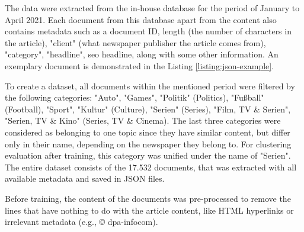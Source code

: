 \documentclass[fontsize=12pt,a4paper,twoside,openany]{scrbook}
\begin{document}
The data were extracted from the in-house database for the period of January to April 2021. Each document from this database apart from the content also contains metadata such as a document ID, length (the number of characters in the article), "client" (what newspaper publisher the article comes from), "category", "headline", seo headline, along with some other information. An exemplary document is demonstrated in the Listing \ref{listing:json-example}.

To create a dataset, all documents within the mentioned period were filtered by the following categories: "Auto", "Games", "Politik" (Politics), "Fußball" (Football), "Sport", "Kultur" (Culture), "Serien" (Series), "Film, TV \& Serien", "Serien, TV \& Kino" (Series, TV \& Cinema). The last three categories were considered as belonging to one topic since they have similar content, but differ only in their name, depending on the newspaper they belong to. For clustering evaluation after training, this category was unified under the name of "Serien". The entire dataset consists of the 17.532 documents, that was extracted with all available metadata and saved in JSON files.

Before training, the content of the documents was pre-processed to remove the lines that have nothing to do with the article content, like HTML hyperlinks or irrelevant metadata (e.g., © dpa-infocom).
\end{document}
